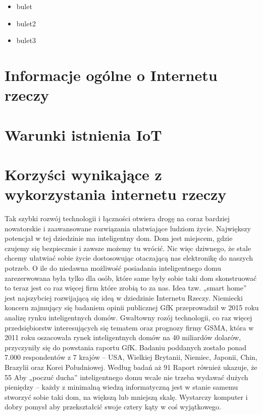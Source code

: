 \documentclass[brudnopis]{xmgr}
\begin{document}
\begin{itemize}
\item
bulet
\item
bulet2
\item
bulet3
\end{itemize}



\section{Informacje ogólne o Internetu rzeczy}


\section{Warunki istnienia IoT}


\section{Korzyści wynikające z wykorzystania internetu rzeczy}
Tak szybki rozwój technologii i łączności otwiera drogę na coraz bardziej nowatorskie i zaawansowane rozwiązania ułatwiające ludziom życie. Największy potencjał w tej dziedzinie ma inteligentny dom. Dom jest miejscem, gdzie czujemy się bezpiecznie i zawsze możemy tu wrócić. Nic więc dziwnego, że stale chcemy ułatwiać sobie życie dostosowując otaczającą nas elektronikę do naszych potrzeb.
O ile do niedawna możliwość posiadania inteligentnego domu zarezerwowana była tylko dla osób, które same były sobie taki dom skonstruować to teraz jest co raz więcej firm które zrobią to za nas. Idea tzw. „smart home” jest najszybciej rozwijającą się ideą w dziedzinie Internetu Rzeczy. Niemiecki koncern zajmujący się badaniem opinii publicznej GfK przeprowadził w 2015 roku analizę rynku inteligentnych domów. Gwałtowny rozój technologii, co raz więcej przedsiębiorstw interesujących się tematem oraz prognozy firmy GSMA, która w 2011 roku oszacowała rynek inteligentnych domów na 40 miliardów dolarów, przyczyniły się do powstania raportu GfK. Badaniu poddanych zostało ponad 7.000 respondentów z 7 krajów – USA, Wielkiej Brytanii, Niemiec, Japonii, Chin, Brazylii oraz Korei Południowej. Według badań aż 91%
Raport również ukazuje, że 55%
Aby „poczuć ducha” inteligentnego domu wcale nie trzeba wydawać dużych pieniędzy – każdy z minimalną wiedzą informatyczną jest w stanie samemu stworzyć sobie taki dom, na większą lub mniejszą skalę. Wystarczy komputer i dobry pomysł aby przekształcić swoje cztery kąty w coś wyjątkowego.
\end{document}
